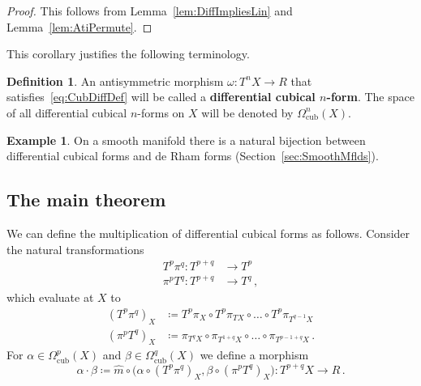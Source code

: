 \documentclass[12pt,reqno, a4paper]{amsart}
\numberwithin{equation}{section}
\theoremstyle{plain}
\theoremstyle{definition}
\newtheorem{Definition}[Theorem]{Definition}
\newtheorem{Example}[Theorem]{Example}
\theoremstyle{remark}
\newcommand{\Rmult}{\hat{m}}
\begin{document}
\begin{proof}
This follows from Lemma~\ref{lem:DiffImpliesLin} and Lemma~\ref{lem:AtiPermute}.
\end{proof}

This corollary justifies the following terminology.

\begin{Definition}
\label{def:CubeForms}
An antisymmetric morphism $\omega\colon T^n X \to R$ that satisfies~\eqref{eq:CubDiffDef} will be called a \textbf{differential cubical $n$-form}.
The space of all differential cubical $n$-forms on $X$ will be denoted by $\Omega^n_\mathrm{cub}(X)$.
\end{Definition}


\begin{Example}
On a smooth manifold there is a natural bijection between differential cubical forms and de Rham forms (Section~\ref{sec:SmoothMflds}).
\end{Example}


\subsection{The main theorem}

We can define the multiplication of differential cubical forms as follows. Consider the natural transformations
\begin{align*}
  T^p \pi^q\colon T^{p+q} &\longrightarrow T^p
  \\
  \pi^p T^q\colon T^{p+q} &\longrightarrow T^q
  \,,
\end{align*}
which evaluate at $X$ to
\begin{align*}
  (T^p \pi^q)_X
  &\coloneqq T^p \pi_{X} \circ T^p \pi_{TX} \circ \ldots \circ
  T^p \pi_{T^{q-1}X}
  \\
  (\pi^p T^q)_X
  &\coloneqq
  \pi_{T^{q} X} \circ \pi_{T^{1+q}X} \circ \ldots \circ
  \pi_{T^{p-1+q}X}
  \,.
\end{align*}
For $\alpha \in \Omega^p_\mathrm{cub}(X)$ and $\beta \in \Omega^q_\mathrm{cub}(X)$ we define a morphism
\begin{equation}
\label{eq:FormProd}
  \alpha \cdot \beta
  \coloneqq \Rmult\circ\bigl(\alpha\circ (T^p\pi^q)_X,\beta\circ(\pi^pT^q)_X\bigr)
  \colon T^{p+q} X \longrightarrow R
  \,.
\end{equation}
\end{document}
